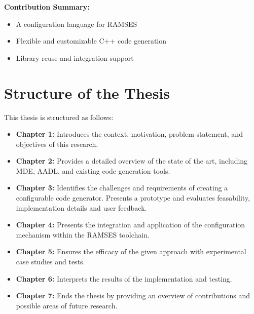 \begin{tcolorbox}[colback=green!5]
	\textbf{Contribution Summary:}
	\begin{itemize}
		\item A configuration language for \gls{RAMSES}
		\item Flexible and customizable C++ code generation
		\item Library reuse and integration support
	\end{itemize}
\end{tcolorbox}



\section{Structure of the Thesis}

This thesis is structured as follows:

\begin{itemize}
	\item \textbf{Chapter 1:} Introduces the context, motivation, problem statement, and objectives of this research.
	\item \textbf{Chapter 2:} Provides a detailed overview of the state of the art, including \gls{MDE}, \gls{AADL}, and existing code generation tools.
	\item \textbf{Chapter 3:} Identifies the challenges and requirements of creating a configurable code generator. Presents a prototype and evaluates feasability, implementation details and user feedback.
	\item \textbf{Chapter 4:} Presents the integration and application of the configuration mechanism within the \gls{RAMSES} toolchain.
	\item \textbf{Chapter 5:} Ensures the efficacy of the given approach with experimental case studies and tests.
	\item \textbf{Chapter 6:} Interprets the results of the implementation and testing.
	\item \textbf{Chapter 7:} Ends the thesis by providing an overview of contributions and possible areas of future research.
\end{itemize}










